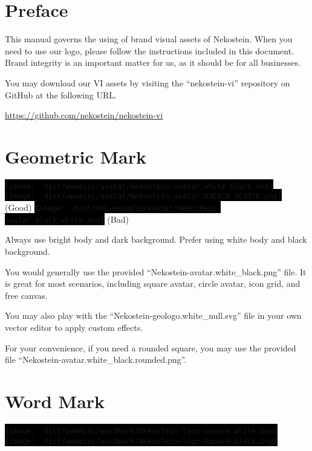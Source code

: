\documentclass[a4paper,11pt]{report}
\newcommand{\altfbox}[1]{%
    \colorbox{black}{#1}%
}
\begin{document}
\sffamily

\tableofcontents\clearpage




\chapter{Preface}
This manual governs the using of brand visual assets of Nekostein.
When you need to use our logo, please follow the instructions included in this document.
Brand integrity is an important matter for us, as it should be for all businesses.

You may download our VI assets by visiting the ``nekostein-vi'' repository on GitHub at the following URL.

\begin{center}
    \href{https://github.com/nekostein/nekostein-vi}{https://github.com/nekostein/nekostein-vi}
\end{center}






\chapter{Geometric Mark}
\altfbox{\texttt{[image: \_dist/wwwmisc/avatar/Nekostein-avatar.white\_black.png]}}~~%
\altfbox{\texttt{[image: \_dist/wwwmisc/avatar/Nekostein-avatar.D3E9CA\_0E497E.png]}} (Good)
\hfill
\altfbox{\texttt{[image: \_dist/doc-example/avatar/Nekostein-avatar.black\_white.png]}} (Bad)

Always use bright body and dark background. Prefer using white body and black background.

You would generally use the provided ``Nekostein-avatar.white\_black.png'' file.
It is great for most scenarios, including square avatar, circle avatar, icon grid, and free canvas.

You may also play with the ``Nekostein-geologo.white\_null.svg'' file in your own vector editor to apply custom effects.

For your convenience, if you need a rounded square,
you may use the provided file ``Nekostein-avatar.white\_black.rounded.png''.





\chapter{Word Mark}
\altfbox{\texttt{[image: \_dist/wwwmisc/wordmark/Nekostein-logo-square.white.png]}}~~%
\altfbox{\texttt{[image: \_dist/wwwmisc/wordmark/Nekostein-logo-square.black.png]}}
\end{document}
